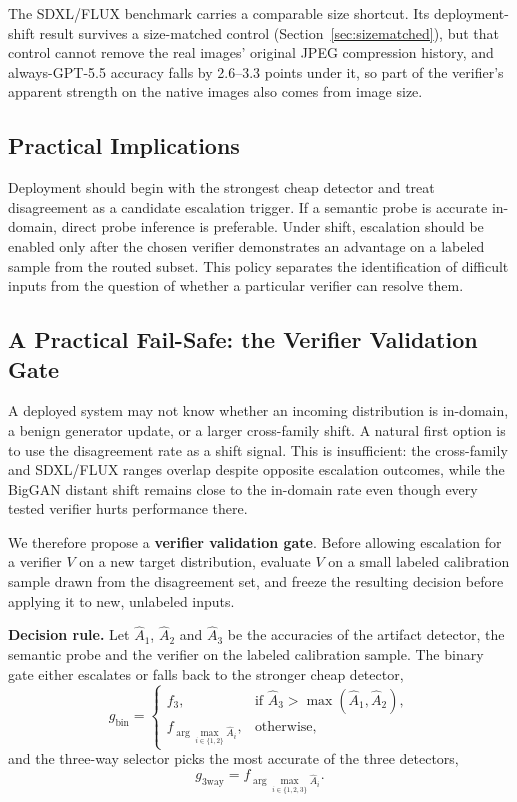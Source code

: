 \documentclass{ieeeaccess}
\begin{document}
The SDXL/FLUX benchmark carries a comparable size shortcut. Its deployment-shift result
survives a size-matched control (Section~\ref{sec:sizematched}), but that control cannot
remove the real images' original JPEG compression history, and always-GPT-5.5 accuracy
falls by 2.6--3.3 points under it, so part of the verifier's apparent strength on the
native images also comes from image size.

\subsection{Practical Implications}

Deployment should begin with the strongest cheap detector and treat disagreement as a
candidate escalation trigger. If a semantic probe is accurate in-domain, direct probe
inference is preferable. Under shift, escalation should be enabled only after the chosen
verifier demonstrates an advantage on a labeled sample from the routed subset. This
policy separates the identification of difficult inputs from the question of whether a
particular verifier can resolve them.

\subsection{A Practical Fail-Safe: the Verifier Validation Gate}
\label{sec:validation_gate}

A deployed system may not know whether an incoming distribution is in-domain, a benign
generator update, or a larger cross-family shift. A natural first option is to use the
disagreement rate as a shift signal. This is insufficient: the cross-family and
SDXL/FLUX ranges overlap despite opposite escalation outcomes, while the BigGAN distant
shift remains close to the in-domain rate even though every tested verifier hurts
performance there.

We therefore propose a \textbf{verifier validation gate}. Before allowing escalation for
a verifier $V$ on a new target distribution, evaluate $V$ on a small labeled calibration
sample drawn from the disagreement set, and freeze the resulting decision before
applying it to new, unlabeled inputs.

\textbf{Decision rule.} Let $\hat A_1$, $\hat A_2$ and $\hat A_3$ be the accuracies of the
artifact detector, the semantic probe and the verifier on the labeled calibration sample.
The binary gate either escalates or falls back to the stronger cheap detector,
\begin{equation}
g_{\text{bin}} =
\begin{cases}
f_3, & \text{if } \hat A_3 > \max(\hat A_1, \hat A_2),\\
f_{\arg\max_{i \in \{1,2\}} \hat A_i}, & \text{otherwise,}
\end{cases}
\label{eq:gate_binary}
\end{equation}
and the three-way selector picks the most accurate of the three detectors,
\begin{equation}
g_{\text{3way}} = f_{\arg\max_{i \in \{1,2,3\}} \hat A_i}.
\label{eq:gate_threeway}
\end{equation}
\end{document}
